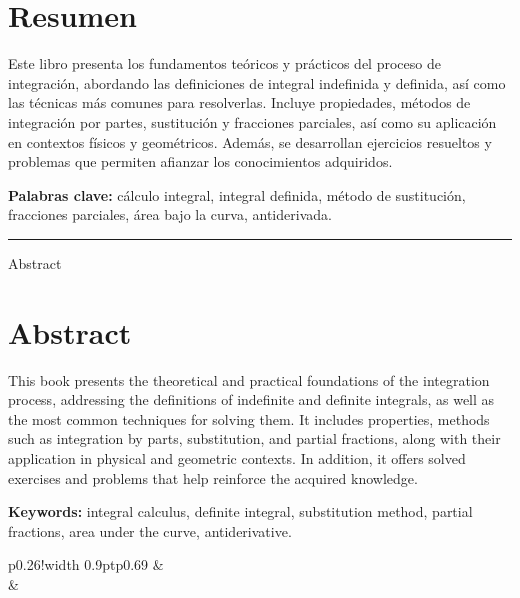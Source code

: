 \chapter*{Resumen}

Este libro presenta los fundamentos teóricos y prácticos del proceso de integración, abordando las definiciones de integral indefinida y definida, así como las técnicas más comunes para resolverlas. Incluye propiedades, métodos de integración por partes, sustitución y fracciones parciales, así como su aplicación en contextos físicos y geométricos. Además, se desarrollan ejercicios resueltos y problemas que permiten afianzar los conocimientos adquiridos.

\textbf{Palabras clave:} cálculo integral, integral definida, método de sustitución, fracciones parciales, área bajo la curva, antiderivada.

\noindent\rule{1.8cm}{0.4pt}
\vspace{1mm}


{\medseries \large Abstract }
\vspace*{1mm}

\chapter*{Abstract}

This book presents the theoretical and practical foundations of the integration process, addressing the definitions of indefinite and definite integrals, as well as the most common techniques for solving them. It includes properties, methods such as integration by parts, substitution, and partial fractions, along with their application in physical and geometric contexts. In addition, it offers solved exercises and problems that help reinforce the acquired knowledge.

\textbf{Keywords:} integral calculus, definite integral, substitution method, partial fractions, area under the curve, antiderivative.

\vspace{1cm}
\begin{tabular}{p{}!{\vrule width 0.9pt}p{0.69\textwidth}}
	& \hspace{2mm}{\medseries \fontsize{11pt}{9pt}\selectfont{¿Como citar este libro?~/ How to cite this book?}} \\[3.5pt]
	& \hangindent=2mm 
	\fontsize{9pt}{9pt}\selectfont{Zambrano Caviedes, J. y Baquero Torres, E. (2025). Problemas resueltos de integración múltiple con aplicaciones en Wolfram Mathematica. Universidad Distrital Francisco José de Caldas-Editorial UD. DOI: XXXX}\\
\end{tabular}

